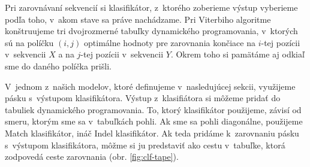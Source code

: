 Pri zarovnávaní sekvencií si klasifikátor, z~ktorého zoberieme výstup vyberieme podľa toho, v~akom stave sa práve nachádzame. Pri Viterbiho algoritme konštruujeme tri dvojrozmerné tabuľky dynamického programovania, v~ktorých sú na políčku $(i, j)$ optimálne hodnoty pre zarovnania končiace na $i$-tej pozícii v~sekvencii $X$ a na $j$-tej pozícii v~sekvencii $Y$. Okrem toho si pamätáme aj odkiaľ sme do daného políčka prišli.

V~jednom z~našich modelov, ktoré definujeme v~nasledujúcej sekcii, využijeme pásku s~výstupom klasifikátora. Výstup z~klasifiátora si môžeme pridať do tabuliek dynamického programovania.
To, ktorý klasifikátor použijeme, závisí od smeru, ktorým sme sa v~tabuľkách pohli. Ak sme sa pohli diagonálne, použijeme Match klasifikátor, ináč Indel klasifikátor.
Ak teda pridáme k~zarovnaniu pásku s~výstupom klasifikátora, môžme si ju predstaviť ako cestu v~tabuľke, ktorá zodpovedá ceste zarovnania
(obr. \ref{fig:clf-tape}).


